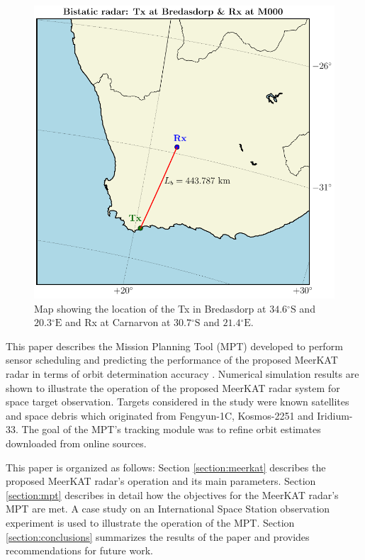 \documentclass[conference]{IEEEtran}
\begin{document}
\begin{figure}[t]
	\centering
	\includegraphics[scale=0.48]{bisradvisual.pdf}
	\caption{Map showing the location of the Tx in Bredasdorp at $34.6\mathrm{^\circ}\text{S}$ and $20.3\mathrm{^\circ}\text{E}$ and Rx at Carnarvon at $30.7\mathrm{^\circ}\text{S}$ and $21.4\mathrm{^\circ}\text{E}$.} 
	\label{fig:map}
\end{figure}
This paper describes the Mission Planning Tool (MPT) developed to perform sensor scheduling and predicting the performance of the proposed MeerKAT radar in terms of orbit determination accuracy \cite{ashivmsc}. Numerical simulation results are shown to illustrate the operation of the proposed MeerKAT radar system for space target observation. Targets considered in the study \cite{ashivmsc} were known satellites and space debris which originated from Fengyun-1C, Kosmos-2251 and Iridium-33. The goal of the MPT's tracking module was to refine orbit estimates downloaded from online sources.

This paper is organized as follows: Section \ref{section:meerkat} describes the proposed MeerKAT radar's operation and its main parameters. Section \ref{section:mpt} describes in detail how the objectives for the MeerKAT radar's MPT are met. A case study on an International Space Station observation experiment is used to illustrate the operation of the MPT. Section \ref{section:conclusions} summarizes the results of the paper and provides recommendations for future work. 
\end{document}
